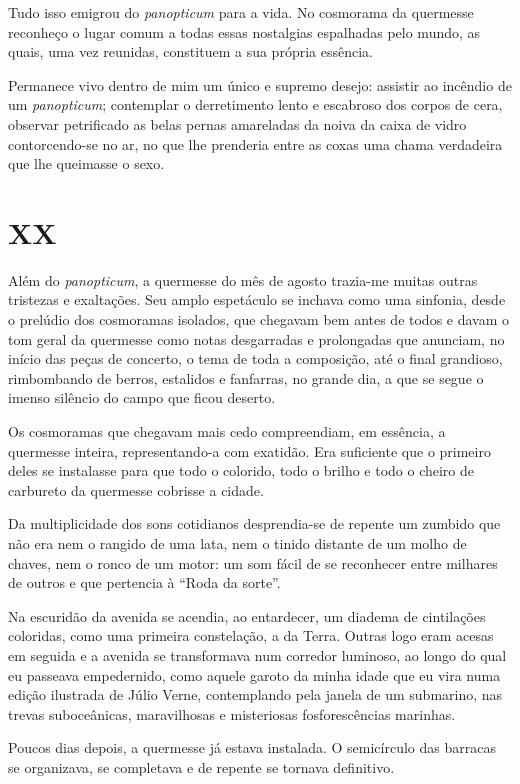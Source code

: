 Tudo isso emigrou do \textit{panopticum} para a vida. No cosmorama da quermesse reconheço o lugar comum a todas essas nostalgias espalhadas pelo mundo, as quais, uma vez reunidas, constituem a sua própria essência.

Permanece vivo dentro de mim um único e supremo desejo: assistir ao incêndio de um \textit{panopticum}; contemplar o derretimento lento e escabroso dos corpos de cera, observar petrificado as belas pernas amareladas da noiva da caixa de vidro contorcendo-se no ar, no que lhe prenderia entre as coxas uma chama verdadeira que lhe queimasse o sexo.


\chapter*{\centering\Large{XX}}

Além do \textit{panopticum}, a quermesse do mês de agosto trazia-me muitas outras tristezas e exaltações. Seu amplo espetáculo se inchava como uma sinfonia, desde o prelúdio dos cosmoramas isolados, que chegavam bem antes de todos e davam o tom geral da quermesse como notas desgarradas e prolongadas que anunciam, no início das peças de concerto, o tema de toda a composição, até o final grandioso, rimbombando de berros, estalidos e fanfarras, no grande dia, a que se segue o imenso silêncio do campo que ficou deserto.

Os cosmoramas que chegavam mais cedo compreendiam, em essência, a quermesse inteira, representando-a com exatidão. Era suficiente que o primeiro deles se instalasse para que todo o colorido, todo o brilho e todo o cheiro de carbureto da quermesse cobrisse a cidade.

Da multiplicidade dos sons cotidianos desprendia-se de repente um zumbido que não era nem o rangido de uma lata, nem o tinido distante de um molho de chaves, nem o ronco de um motor: um som fácil de se reconhecer entre milhares de outros e que pertencia à ``Roda da sorte''.

Na escuridão da avenida se acendia, ao entardecer, um diadema de cintilações coloridas, como uma primeira constelação, a da Terra. Outras logo eram acesas em seguida e a avenida se transformava num corredor luminoso, ao longo do qual eu passeava empedernido, como aquele garoto da minha idade que eu vira numa edição ilustrada de Júlio Verne, contemplando pela janela de um submarino, nas trevas suboceânicas, maravilhosas e misteriosas fosforescências marinhas.

Poucos dias depois, a quermesse já estava instalada. O semicírculo das barracas se organizava, se completava e de repente se tornava definitivo.

